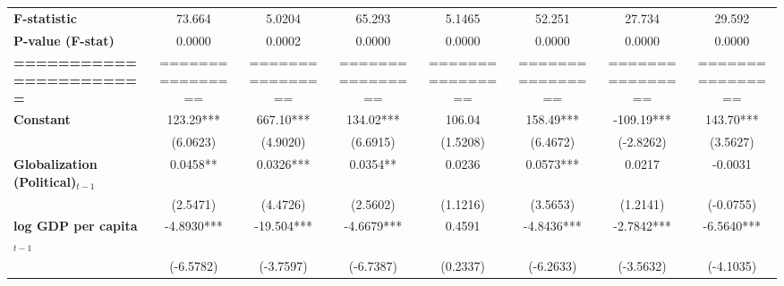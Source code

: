 \begin{center}
\begin{tabular}{lccccccc}
\textbf{F-statistic}               &        73.664        &            5.0204           &            65.293            &                5.1465               &              52.251              &            27.734           &             29.592             \\
\textbf{P-value (F-stat)}          &        0.0000        &            0.0002           &            0.0000            &                0.0000               &              0.0000              &            0.0000           &             0.0000             \\
\textbf{=======================}   &   ================   &       ================      &       ================       &           ================          &         ================         &       ================      &        ================        \\
\textbf{Constant}                     &      123.29***       &          667.10***          &          134.02***           &                106.04               &            158.49***             &          -109.19***         &           143.70***            \\
\textbf{ }                         &       (6.0623)       &           (4.9020)          &           (6.6915)           &               (1.5208)              &             (6.4672)             &          (-2.8262)          &            (3.5627)            \\
\textbf{Globalization (Political)$_{t-1}$}             &       0.0458**       &          0.0326***          &           0.0354**           &                0.0236               &            0.0573***             &            0.0217           &            -0.0031             \\
\textbf{ }                         &       (2.5471)       &           (4.4726)          &           (2.5602)           &               (1.1216)              &             (3.5653)             &           (1.2141)          &           (-0.0755)            \\
\textbf{log GDP per capita$_{t-1}$}           &      -4.8930***      &          -19.504***         &          -4.6679***          &                0.4591               &            -4.8436***            &          -2.7842***         &           -6.5640***           \\
\textbf{ }                         &      (-6.5782)       &          (-3.7597)          &          (-6.7387)           &               (0.2337)              &            (-6.2633)             &          (-3.5632)          &           (-4.1035)            \\

\end{tabular}
\end{center}
